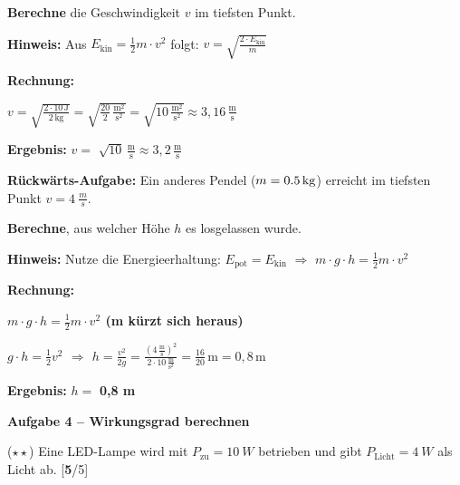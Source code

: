 \documentclass[11pt, a4paper]{article}
\newcommand{\lsg}[1]{\textcolor{loesung}{\textbf{#1}}}
\newcommand{\punktebox}[1]{\hfill\small\textcolor{mittelgrau}{[\lsg{#1}/#1]}}
\newcommand{\aufgabe}[1]{%
    \needspace{4\baselineskip}%
    \vspace{10pt}%
    \noindent\textbf{\textcolor{fachfarbe}{Aufgabe #1}}%
    \vspace{4pt}%
    \nopagebreak[4]%
}
\newcommand{\operator}[1]{\textbf{\textcolor{fachfarbe}{#1}}}
\begin{document}
\begin{teil}
\item \operator{Berechne} die Geschwindigkeit $v$ im tiefsten Punkt.

\vspace{4pt}
\textbf{Hinweis:} Aus $E_\text{kin} = \frac{1}{2} m \cdot v^2$ folgt: $v = \sqrt{\frac{2 \cdot E_\text{kin}}{m}}$

\vspace{6pt}
\textbf{Rechnung:}

\lsg{$v = \sqrt{\frac{2 \cdot 10\,\text{J}}{2\,\text{kg}}} = \sqrt{\frac{20}{2}\,\frac{\text{m}^2}{\text{s}^2}} = \sqrt{10\,\frac{\text{m}^2}{\text{s}^2}} \approx 3{,}16\,\frac{\text{m}}{\text{s}}$}

\textbf{Ergebnis:} $v = $ \lsg{$\sqrt{10}\,\frac{\text{m}}{\text{s}} \approx 3{,}2\,\frac{\text{m}}{\text{s}}$}

\vspace{4pt}

\item \textbf{Rückwärts-Aufgabe:} Ein anderes Pendel ($m = \SI{0{,}5}{kg}$) erreicht im tiefsten Punkt $v = \SI{4}{\frac{m}{s}}$.

\operator{Berechne}, aus welcher Höhe $h$ es losgelassen wurde.

\vspace{4pt}
\textbf{Hinweis:} Nutze die Energieerhaltung: $E_\text{pot} = E_\text{kin}$ \quad $\Rightarrow$ \quad $m \cdot g \cdot h = \frac{1}{2} m \cdot v^2$

\vspace{6pt}
\textbf{Rechnung:}

\lsg{$m \cdot g \cdot h = \frac{1}{2} m \cdot v^2$ \quad (m kürzt sich heraus)}

\lsg{$g \cdot h = \frac{1}{2} v^2$ \quad $\Rightarrow$ \quad $h = \frac{v^2}{2g} = \frac{(4\,\frac{\text{m}}{\text{s}})^2}{2 \cdot 10\,\frac{\text{m}}{\text{s}^2}} = \frac{16}{20}\,\text{m} = 0{,}8\,\text{m}$}

\textbf{Ergebnis:} $h = $ \lsg{0,8 m}
\end{teil}

\vspace{0.5em}

\aufgabe{4 – Wirkungsgrad berechnen}

($\star\star$) Eine LED-Lampe wird mit $P_\text{zu} = \SI{10}{W}$ betrieben und gibt $P_\text{Licht} = \SI{4}{W}$ als Licht ab. \punktebox{5}
\end{document}
